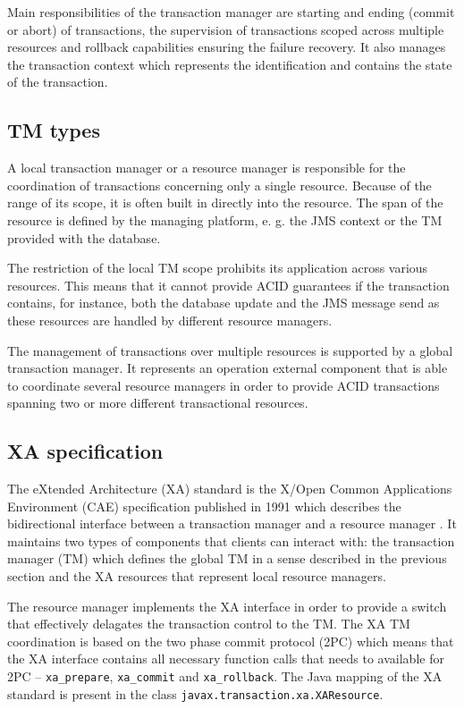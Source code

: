 \documentclass[oneside,
  digital, %
  table,   %
  nolof,     %
  nolot,     %
]{fithesis3}
\begin{document}
Main responsibilities of the transaction manager are starting and ending (commit or abort) of transactions, the supervision of transactions scoped across multiple resources and rollback capabilities ensuring the failure recovery. It also manages the transaction context which represents the identification and contains the state of the transaction.

\subsection{TM types}

A local transaction manager or a resource manager is responsible for the coordination of transactions concerning only a single resource. Because of the range of its scope, it is often built in directly into the resource. The span of the resource is defined by the managing platform, e. g. the JMS context or the TM provided with the database.  

The restriction of the local TM scope prohibits its application across various resources. This means that it cannot provide ACID guarantees if the transaction contains, for instance, both the database update and the JMS message send as these resources are handled by different resource managers.

The management of transactions over multiple resources is supported by a global transaction manager. It represents an operation external component that is able to coordinate several resource managers in order to provide ACID transactions spanning two or more different transactional resources.

\subsection{XA specification}

The eXtended Architecture (XA) standard is the X/Open Common Applications Environment (CAE) specification published in 1991 which describes the bidirectional interface between a transaction manager and a resource manager \cite{xa_spec}. It maintains two types of components that clients can interact with: the transaction manager (TM) which defines the global TM in a sense described in the previous section and the XA resources that represent local resource managers.

The resource manager implements the XA interface in order to provide a switch that effectively delagates the transaction control to the TM. The XA TM coordination is based on the two phase commit protocol (2PC) which means that the XA interface contains all necessary function calls that needs to available for 2PC -- \texttt{xa\_prepare}, \texttt{xa\_commit} and \texttt{xa\_rollback}. The Java mapping of the XA standard is present in the class \texttt{javax.transaction.xa.XAResource}.
\end{document}
